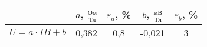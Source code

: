 \begin{tabular}{l|cccc}
	\toprule
	 & $a$, $\frac{\text{Ом}}{\text{Тл}}$ & $\varepsilon_a$, \% & $b$, $\frac{\text{мВ}}{\text{Тл}}$ & $\varepsilon_b$, \% \\ \midrule
	$U=a\cdot IB + b$ & 0,382 & 0,8 & -0,021 & 3 \\
\bottomrule
\end{tabular}
